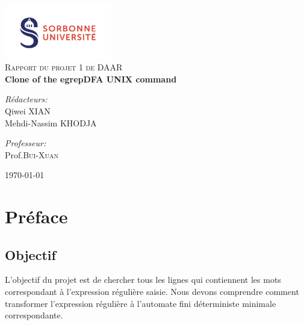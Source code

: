 \documentclass[14px]{article}
\begin{document}
\setlength{\parindent}{0pt}
\begin{titlepage}

	\begin{center}
		\includegraphics[width=0.35\textwidth]{logo.png}\\[1cm]

		\textsc{\Large Rapport du projet 1 de DAAR}\\[0.5cm]


		{ \huge \bfseries Clone of the egrepDFA UNIX command}\\[0.4cm]

		\begin{minipage}{0.4\textwidth}
			\begin{flushleft} \large
				\emph{Rédacteurs:}\\
				Qiwei \textsc{XIAN}\\
				Mehdi-Nassim \textsc{KHODJA}
			\end{flushleft}
		\end{minipage}
		\begin{minipage}{0.4\textwidth}
			\begin{flushright} \large
				\emph{Professeur:} \\
				Prof.\textsc{Bui-Xuan}
			\end{flushright}
		\end{minipage}

		\vfill
		{\large \today}
	\end{center}

\end{titlepage}
\clearpage

\tableofcontents
\thispagestyle{empty}
\clearpage

\pagestyle{fancy}

\rhead{\thepage}
\fancyfoot{}

\section{Préface}
\subsection{Objectif}
L'objectif du projet est de chercher tous les lignes qui contiennent les mots correspondant à l'expression régulière saisie. Nous devons comprendre comment transformer l'expression régulière à l'automate fini déterministe minimale correspondante.
\end{document}
